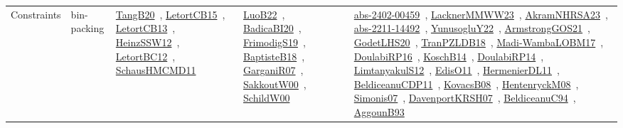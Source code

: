 {\begin{longtable}{lp{3cm}>{\raggedright\arraybackslash}p{6cm}>{\raggedright\arraybackslash}p{6cm}>{\raggedright\arraybackslash}p{8cm}}
Constraints & bin-packing & \href{works/TangB20.pdf}{TangB20}~\cite{TangB20}, \href{works/LetortCB15.pdf}{LetortCB15}~\cite{LetortCB15}, \href{works/LetortCB13.pdf}{LetortCB13}~\cite{LetortCB13}, \href{works/HeinzSSW12.pdf}{HeinzSSW12}~\cite{HeinzSSW12}, \href{works/LetortBC12.pdf}{LetortBC12}~\cite{LetortBC12}, \href{works/SchausHMCMD11.pdf}{SchausHMCMD11}~\cite{SchausHMCMD11} & \href{works/LuoB22.pdf}{LuoB22}~\cite{LuoB22}, \href{works/BadicaBI20.pdf}{BadicaBI20}~\cite{BadicaBI20}, \href{works/FrimodigS19.pdf}{FrimodigS19}~\cite{FrimodigS19}, \href{works/BaptisteB18.pdf}{BaptisteB18}~\cite{BaptisteB18}, \href{works/GarganiR07.pdf}{GarganiR07}~\cite{GarganiR07}, \href{works/SakkoutW00.pdf}{SakkoutW00}~\cite{SakkoutW00}, \href{works/SchildW00.pdf}{SchildW00}~\cite{SchildW00} & \href{works/abs-2402-00459.pdf}{abs-2402-00459}~\cite{abs-2402-00459}, \href{works/LacknerMMWW23.pdf}{LacknerMMWW23}~\cite{LacknerMMWW23}, \href{works/AkramNHRSA23.pdf}{AkramNHRSA23}~\cite{AkramNHRSA23}, \href{works/abs-2211-14492.pdf}{abs-2211-14492}~\cite{abs-2211-14492}, \href{works/YunusogluY22.pdf}{YunusogluY22}~\cite{YunusogluY22}, \href{works/ArmstrongGOS21.pdf}{ArmstrongGOS21}~\cite{ArmstrongGOS21}, \href{works/GodetLHS20.pdf}{GodetLHS20}~\cite{GodetLHS20}, \href{works/TranPZLDB18.pdf}{TranPZLDB18}~\cite{TranPZLDB18}, \href{works/Madi-WambaLOBM17.pdf}{Madi-WambaLOBM17}~\cite{Madi-WambaLOBM17}, \href{works/DoulabiRP16.pdf}{DoulabiRP16}~\cite{DoulabiRP16}, \href{works/KoschB14.pdf}{KoschB14}~\cite{KoschB14}, \href{works/DoulabiRP14.pdf}{DoulabiRP14}~\cite{DoulabiRP14}, \href{works/LimtanyakulS12.pdf}{LimtanyakulS12}~\cite{LimtanyakulS12}, \href{works/EdisO11.pdf}{EdisO11}~\cite{EdisO11}, \href{works/HermenierDL11.pdf}{HermenierDL11}~\cite{HermenierDL11}, \href{works/BeldiceanuCDP11.pdf}{BeldiceanuCDP11}~\cite{BeldiceanuCDP11}, \href{works/KovacsB08.pdf}{KovacsB08}~\cite{KovacsB08}, \href{works/HentenryckM08.pdf}{HentenryckM08}~\cite{HentenryckM08}, \href{works/Simonis07.pdf}{Simonis07}~\cite{Simonis07}, \href{works/DavenportKRSH07.pdf}{DavenportKRSH07}~\cite{DavenportKRSH07}, \href{works/BeldiceanuC94.pdf}{BeldiceanuC94}~\cite{BeldiceanuC94}, \href{works/AggounB93.pdf}{AggounB93}~\cite{AggounB93}\\

\end{longtable}}
